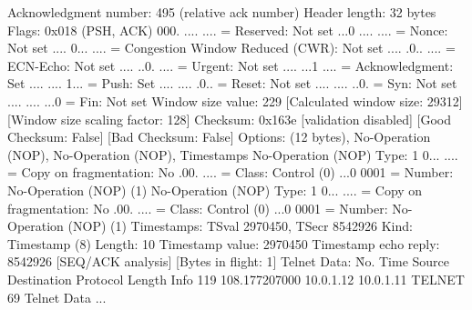     Acknowledgment number: 495    (relative ack number)
    Header length: 32 bytes
    Flags: 0x018 (PSH, ACK)
        000. .... .... = Reserved: Not set
        ...0 .... .... = Nonce: Not set
        .... 0... .... = Congestion Window Reduced (CWR): Not set
        .... .0.. .... = ECN-Echo: Not set
        .... ..0. .... = Urgent: Not set
        .... ...1 .... = Acknowledgment: Set
        .... .... 1... = Push: Set
        .... .... .0.. = Reset: Not set
        .... .... ..0. = Syn: Not set
        .... .... ...0 = Fin: Not set
    Window size value: 229
    [Calculated window size: 29312]
    [Window size scaling factor: 128]
    Checksum: 0x163e [validation disabled]
        [Good Checksum: False]
        [Bad Checksum: False]
    Options: (12 bytes), No-Operation (NOP), No-Operation (NOP), Timestamps
        No-Operation (NOP)
            Type: 1
                0... .... = Copy on fragmentation: No
                .00. .... = Class: Control (0)
                ...0 0001 = Number: No-Operation (NOP) (1)
        No-Operation (NOP)
            Type: 1
                0... .... = Copy on fragmentation: No
                .00. .... = Class: Control (0)
                ...0 0001 = Number: No-Operation (NOP) (1)
        Timestamps: TSval 2970450, TSecr 8542926
            Kind: Timestamp (8)
            Length: 10
            Timestamp value: 2970450
            Timestamp echo reply: 8542926
    [SEQ/ACK analysis]
        [Bytes in flight: 1]
Telnet
    Data: \r

No.     Time           Source                Destination           Protocol Length Info
    119 108.177207000  10.0.1.12             10.0.1.11             TELNET   69     Telnet Data ...

